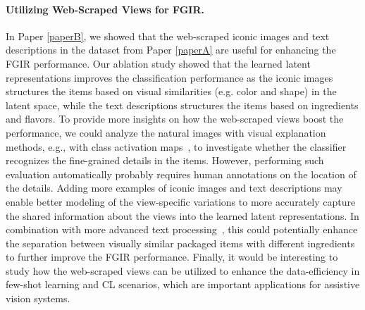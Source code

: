 \paragraph{Utilizing Web-Scraped Views for FGIR.} In Paper \ref{paperB}, we showed that the web-scraped iconic images and text descriptions in the dataset from Paper \ref{paperA} are useful for enhancing the FGIR performance. Our ablation study showed that the learned latent representations improves the classification performance as the iconic images structures the items based on visual similarities (e.g. color and shape) in the latent space, while the text descriptions structures the items based on ingredients and flavors. To provide more insights on how the web-scraped views boost the performance, we could analyze the natural images with visual explanation methods, e.g., with class activation maps~\cite{zhou2016learning, selvaraju2017grad}, to investigate whether the classifier recognizes the fine-grained details in the items. However, performing such evaluation automatically probably requires human annotations on the location of the details. Adding more examples of iconic images and text descriptions may enable better modeling of the view-specific variations to more accurately capture the shared information about the views into the learned latent representations. In combination with more advanced text processing~\cite{lan2019albert,wei2019eda}, this could potentially enhance the separation between visually similar packaged items with different ingredients to further improve the FGIR performance. Finally, it would be interesting to study how the web-scraped views can be utilized to enhance the data-efficiency in few-shot learning and CL scenarios, which are important applications for assistive vision systems.




